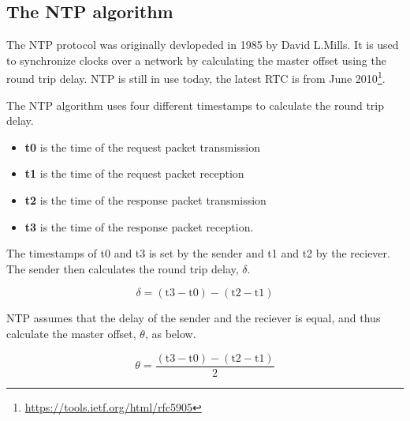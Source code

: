 \subsection{The NTP algorithm}
\label{sec:ntp}

The NTP protocol\cite{mills} was originally devlopeded in 1985 by David L.Mills. It is used to synchronize clocks over a network by calculating the master offset using the round trip delay. NTP is still in use today, the latest RTC is from June 2010\footnote{\url{https://tools.ietf.org/html/rfc5905}}.

The NTP algorithm uses four different timestamps to calculate the round trip delay. 

\begin{itemize}
  \item[] \textbf{t0} is the time of the request packet transmission
  \item[] \textbf{t1} is the time of the request packet reception
  \item[] \textbf{t2} is the time of the response packet transmission
  \item[] \textbf{t3} is the time of the response packet reception.
\end{itemize}
\label{fig:ntpvars}

The timestamps of t0 and t3 is set by the sender and t1 and t2 by the reciever. The sender then calculates the round trip delay, $\delta$. 

\begin{displaymath}
	\delta = (\text{t3} - \text{t0}) - (\text{t2} - \text{t1})
\end{displaymath}
\label{fig:ntpdelta}

NTP assumes that the delay of the sender and the reciever is equal, and thus calculate the master offset, $\theta$,  as below. 

\begin{displaymath}
	\theta = \frac{(\text{t3} - \text{t0}) - (\text{t2} - \text{t1})}{2}
\end{displaymath}
\label{fig:ntpmo}

